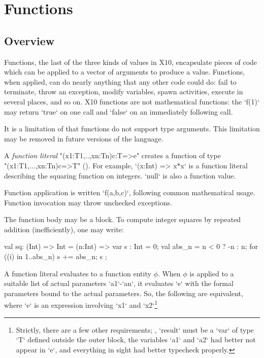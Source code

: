 

\chapter{Functions}
\label{Functions}
\label{functions}
\label{Closures}

\section{Overview}
Functions, the last of the three kinds of values in X10, encapsulate pieces of
code which can be applied to a vector of arguments to produce a value.
Functions, when applied, can do nearly anything that any other code could do:
fail to terminate, throw an exception, modify variables, spawn activities,
execute in several places, and so on. X10 functions are not mathematical
functions: the \xcd`f(1)` may return \xcd`true` on one call and \xcd`false` on
an immediately following call.

It is a limitation of \XtenCurrVer{} that functions do not support
type arguments. This limitation may be removed in future versions of
the language.

A \emph{function literal} \xcd"(x1:T1,..,xn:Tn){c}:T=>e" creates a function of
type\\ \xcd"(x1:T1,...,xn:Tn){c}=>T" ().  For example, 
\xcd`(x:Int) => x*x` is a function literal describing the squaring function on
integers.   
\xcd`null` is also a function value.

Function application is written \xcd`f(a,b,c)`, following common mathematical
usage. 
Function invocation may throw unchecked exceptions. 

The function body may be a block.  To compute integer squares by repeated
addition (inefficiently), one may write: 
\begin{xten}
val sq: (Int) => Int 
      = (n:Int) => {
           var s : Int = 0;
           val abs_n = n < 0 ? -n : n;
           for ((i) in 1..abs_n) s += abs_n;
           s
        };
\end{xten}




A function literal evaluates to a function entity {$\phi$}. When {$\phi$} is
applied to a suitable list of actual parameters \xcd`a1`-\xcd`an`, it
evaluates \xcd`e` with the formal parameters bound to the actual parameters.
So, the following are equivalent, where \xcd`e` is an expression involving
\xcd`x1` and \xcd`x2`\footnote{Strictly, there are a few other requirements;
  \eg, \xcd`result` must be a \xcd`var` of type \xcd`T` defined outside the
  outer block, the variables \xcd`a1` and \xcd`a2` had better not appear in
  \xcd`e`, and everything in sight had better typecheck properly.}

